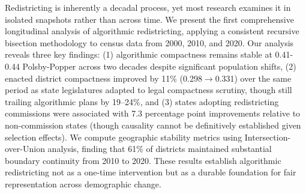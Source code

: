 Redistricting is inherently a decadal process, yet most research examines it in isolated snapshots rather than across time. We present the first comprehensive longitudinal analysis of algorithmic redistricting, applying a consistent recursive bisection methodology to census data from 2000, 2010, and 2020. Our analysis reveals three key findings: (1) algorithmic compactness remains stable at 0.41-0.44 Polsby-Popper across two decades despite significant population shifts, (2) enacted district compactness improved by 11\% (0.298$\to$0.331) over the same period as state legislatures adapted to legal compactness scrutiny, though still trailing algorithmic plans by 19--24\%, and (3) states adopting redistricting commissions were associated with 7.3 percentage point improvements relative to non-commission states (though causality cannot be definitively established given selection effects). We compute geographic stability metrics using Intersection-over-Union analysis, finding that 61\% of districts maintained substantial boundary continuity from 2010 to 2020. These results establish algorithmic redistricting not as a one-time intervention but as a durable foundation for fair representation across demographic change.
